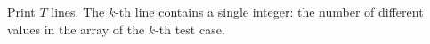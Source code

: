 Print $T$ lines. The $k$-th line contains a single integer: the number of different values in the array of the $k$-th test case.
